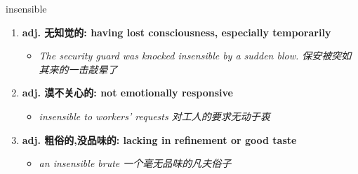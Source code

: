 
\begin{frame}
{\huge insensible}
\begin{center}
\begin{enumerate}\Large
  \item \textbf{adj. 无知觉的: having lost consciousness, especially temporarily}
  \begin{itemize}
    \item \em{\Large{The security guard was knocked insensible by a sudden blow. 保安被突如其来的一击敲晕了}}
  \end{itemize}
  \item \textbf{adj. 漠不关心的: not emotionally responsive}
  \begin{itemize}
    \item \em{\Large{insensible to workers’ requests 对工人的要求无动于衷}}
  \end{itemize}
  \item \textbf{adj. 粗俗的,没品味的: lacking in refinement or good taste}
  \begin{itemize}
    \item \em{\Large{an insensible brute 一个毫无品味的凡夫俗子}}
  \end{itemize}
\end{enumerate}
\end{center}
\end{frame}
